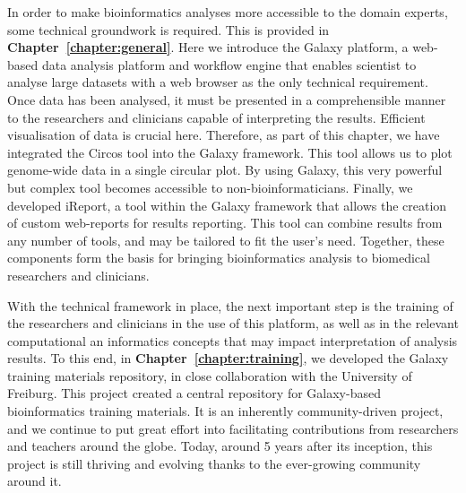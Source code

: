 In order to make bioinformatics analyses more accessible to the domain experts, some technical groundwork is required. This is provided in
\textbf{Chapter~\ref{chapter:general}}. Here we introduce the Galaxy platform, a web-based data analysis platform and workflow engine that enables scientist to analyse large datasets with a web browser as the only technical requirement.
Once data has been analysed, it must be presented in a comprehensible manner to the researchers and clinicians capable of interpreting the results. Efficient visualisation of data is crucial here.
Therefore, as part of this chapter, we have integrated the Circos tool into the Galaxy framework. This tool allows us to plot genome-wide data in a single circular plot. By using Galaxy, this very powerful but complex tool becomes accessible to non-bioinformaticians.
Finally, we developed iReport, a tool within the Galaxy framework that allows the creation of custom web-reports for results reporting. This tool can combine results from any number of tools, and may be tailored to fit the user's need. Together, these components form the basis for bringing bioinformatics analysis to biomedical researchers and clinicians.

With the technical framework in place, the next important step is the training of the researchers and clinicians in the use of this platform, as well as in the relevant computational an informatics concepts that may impact interpretation of analysis results.
To this end, in \textbf{Chapter~\ref{chapter:training}}, we developed the Galaxy training materials repository, in close collaboration with the University of Freiburg. This project created a central repository for Galaxy-based bioinformatics training materials. It is an inherently community-driven project, and we continue to put great effort into facilitating contributions from researchers and teachers around the globe. Today, around 5 years after its inception, this project is still thriving and evolving thanks to the ever-growing community around it.

